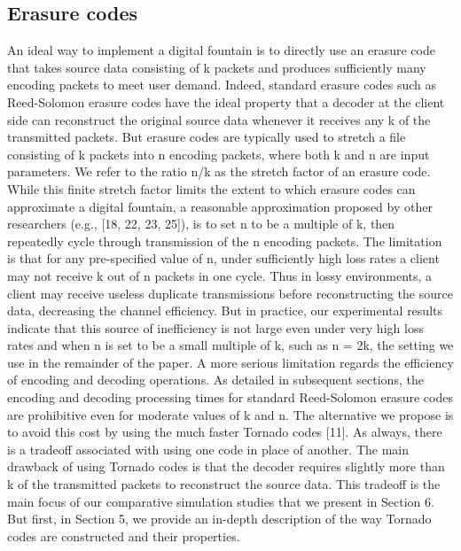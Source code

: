 \documentclass[12pt,a4paper,titlepage,twocolumn]{article}
\begin{document}
\subsection{Erasure codes}
An ideal way to implement a digital fountain is to directly
use an erasure code that takes source data consisting
of k packets and produces sufficiently many encoding
packets to meet user demand. Indeed, standard
erasure codes such as Reed-Solomon erasure codes have
the ideal property that a decoder at the client side can
reconstruct the original source data whenever it receives
any k of the transmitted packets. But erasure codes are
typically used to stretch a file consisting of k packets
into n encoding packets, where both k and n are input
parameters. We refer to the ratio n/k as the stretch factor
of an erasure code. While this finite stretch factor
limits the extent to which erasure codes can approximate
a digital fountain, a reasonable approximation
proposed by other researchers (e.g., [18, 22, 23, 25]), is
to set n to be a multiple of k, then repeatedly cycle
through transmission of the n encoding packets. The
limitation is that for any pre-specified value of n, under
sufficiently high loss rates a client may not receive k out
of n packets in one cycle. Thus in lossy environments, a
client may receive useless duplicate transmissions before
reconstructing the source data, decreasing the channel
efficiency. But in practice, our experimental results indicate
that this source of inefficiency is not large even
under very high loss rates and when n is set to be a
small multiple of k, such as n = 2k, the setting we use
in the remainder of the paper.
A more serious limitation regards the efficiency of
encoding and decoding operations. As detailed in subsequent
sections, the encoding and decoding processing
times for standard Reed-Solomon erasure codes are prohibitive
even for moderate values of k and n. The alternative
we propose is to avoid this cost by using the much
faster Tornado codes [11]. As always, there is a tradeoff
associated with using one code in place of another. The
main drawback of using Tornado codes is that the decoder
requires slightly more than k of the transmitted
packets to reconstruct the source data. This tradeoff
is the main focus of our comparative simulation studies
that we present in Section 6. But first, in Section 5,
we provide an in-depth description of the way Tornado
codes are constructed and their properties.
\end{document}
